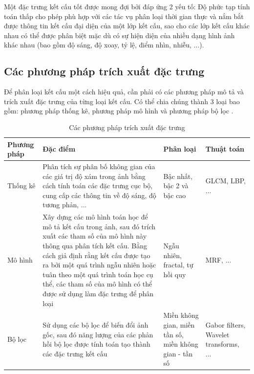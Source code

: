 Một đặc trưng kết cấu tốt được mong đợi bởi đáp ứng 2 yếu tố: Độ phức tạp tính toán thấp cho phép phù hợp với các tác vụ phân loại thời gian thực và nắm bắt được thông tin kết cấu đại diện của một lớp kết cấu, sao cho các lớp kết cấu khác nhau có thể được phân biệt mặc dù có sự hiện diện của nhiều dạng hình ảnh khác nhau (bao gồm độ sáng, độ xoay, tỷ lệ, điểm nhìn, nhiễu, ...).


\subsection{Các phương pháp trích xuất đặc trưng}
Để phân loại kết cấu một cách hiệu quả, cần phải có các phương pháp mô tả và trích xuất đặc trưng của từng loại kết cấu. Có thể chia chúng thành 3 loại bao gồm: phương pháp thống kê, phương pháp mô hình và phương pháp bộ lọc \cite{analyticOfTexture}.

\begin{table}[h]
    \centering
    \renewcommand{\arraystretch}{1.3} %
        \caption{Các phương pháp trích xuất đặc trưng}
    \begin{tabular}{p{3cm} p{7cm} p{3cm} p{2cm}}
        \toprule
        \textbf{Phương pháp} & \textbf{Đặc điểm} & \textbf{Phân loại} & \textbf{Thuật toán} \\
        \midrule
        Thống kê & Phân tích sự phân bố không gian của các giá trị độ xám trong ảnh bằng cách tính toán các đặc trưng cục bộ, cung cấp các thông tin về độ sáng, độ tương phản, ... & Bậc nhất, bậc 2 và bậc cao& GLCM, LBP, ... \\
        \midrule
        Mô hình & Xây dựng các mô hình toán học để mô tả kết cấu trong ảnh, sau đó trích xuất các tham số của mô hình này thông qua phân tích kết cấu. Bằng cách giả định rằng kết cấu được tạo ra bởi một quá trình ngẫu nhiên hoặc tuân theo một quá trình toán học cụ thể, các tham số của mô hình có thể được sử dụng làm đặc trưng để phân loại & Ngẫu nhiên, fractal, tự hồi quy & MRF, ... \\

                \midrule
        Bộ lọc & Sử dụng các bộ lọc để biến đổi ảnh gốc, sau đó năng lượng của các phản hồi bộ lọc được tính toán tạo thành các đặc trưng kết cấu & Miền không gian, miền tần số, miền không gian - tần số & Gabor filters, Wavelet transforms, ... \\
                        \bottomrule

    \end{tabular}

    \label{tab:texture_analysis}
\end{table}

